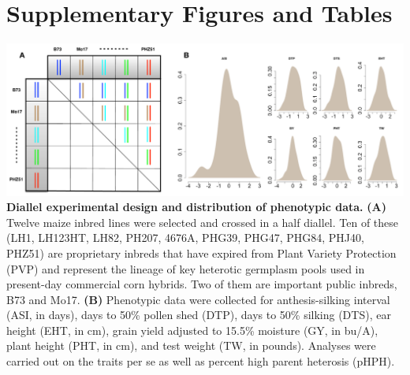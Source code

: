 \documentclass[10pt]{article}
\newcommand{\beginsupplement}{%
        \setcounter{table}{0}
        \renewcommand{\thetable}{S\arabic{table}}%
        \setcounter{figure}{0}
        \renewcommand{\thefigure}{S\arabic{figure}}%
     }
\begin{document}
\pagebreak
\beginsupplement
\section*{Supplementary Figures and Tables}


\begin{center}\vspace{1cm}
\includegraphics[width=0.8\linewidth]{pvp.pdf}
{\color{black} \textbf{Diallel experimental design and distribution of phenotypic data.}
\textbf{(A)} Twelve maize inbred lines were selected and crossed in a half diallel. Ten of these (LH1, LH123HT, LH82, PH207, 4676A, PHG39, PHG47, PHG84, PHJ40, PHZ51) are proprietary inbreds that have expired from Plant Variety Protection (PVP) and represent the lineage of key heterotic germplasm pools used in present-day commercial corn hybrids. Two of them are important public inbreds, B73 and Mo17. \textbf{(B)} Phenotypic data were collected for anthesis-silking interval (ASI, in days), days to 50\% pollen shed (DTP), days to 50\% silking (DTS), ear height (EHT, in cm), grain yield adjusted to 15.5\% moisture (GY, in bu/A), plant height (PHT, in cm), and test weight (TW, in pounds). Analyses were carried out on the traits per se as well as percent high parent heterosis (pHPH).
}
\end{center}\vspace{1cm}
\end{document}

